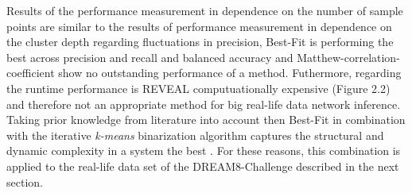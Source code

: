 Results of the performance measurement in dependence on the number of sample points are similar to the results of performance measurement in dependence on the cluster depth regarding fluctuations in precision, Best-Fit is performing the best across precision and recall and balanced accuracy and Matthew-correlation-coefficient show no outstanding performance of a method. Futhermore, regarding the runtime performance is REVEAL computuationally expensive (Figure 2.2) and therefore not an appropriate method for big real-life data network inference. Taking prior knowledge from literature into account then Best-Fit in combination with the iterative \textit{k-means} binarization algorithm captures the structural and dynamic complexity in a system the best \citep{Berestovsky.2013}.
For these reasons, this combination is applied to the real-life data set of the DREAM8-Challenge described in the next section.
